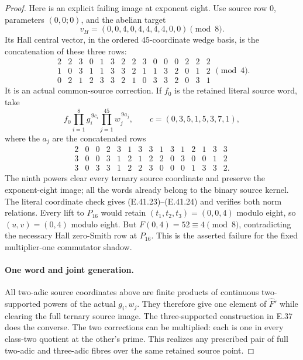 \begin{proof}
Here is an explicit failing image at exponent
eight.  Use source row $0$, parameters $(0,0;0)$,
and the abelian target
\[
             v_H=(0,0,4,0,4,4,4,4,0,0)\pmod8.
 \tag{E.41.23}
\]
Its Hall central vector, in the ordered
$45$-coordinate wedge basis, is the
concatenation of these three rows:
\[
 \begin{array}{rrrrrrrrrrrrrrr}
 2&2&3&0&1&3&2&2&3&0&0&0&2&2&2\\
 1&0&3&1&1&3&3&2&1&1&3&2&0&1&2\\
 0&2&1&2&3&3&2&1&0&3&3&2&0&3&1
 \end{array}
 \pmod4 .
 \tag{E.41.24}
\]
It is an actual common-source correction.
If $f_0$ is the retained literal source word,
take
\[
          f_0\prod_{i=1}^8g_i^{\,9c_i}
                 \prod_{j=1}^{45}w_j^{\,9a_j},
 \qquad c=(0,3,5,1,5,3,7,1),
 \tag{E.41.25}
\]
where the $a_j$ are the concatenated rows
\[
 \begin{array}{rrrrrrrrrrrrrrr}
 2&0&0&2&3&1&3&3&1&3&1&2&1&3&3\\
 3&0&0&3&1&2&1&2&2&0&3&0&0&1&2\\
 3&0&3&3&1&2&2&3&0&0&0&1&3&3&2 .
 \end{array}
 \tag{E.41.26}
\]
The ninth powers clear every ternary source
coordinate and preserve the exponent-eight
image; all the words already belong to the
binary source kernel.
The literal coordinate check gives
\textup{(E.41.23)--(E.41.24)} and verifies
both norm relations.
Every lift to $P_{16}$ would retain
$(t_1,t_2,t_3)=(0,0,4)$ modulo eight,
so $(u,v)=(0,4)$ modulo eight.
But $F(0,4)=52\equiv4\pmod8$, contradicting
the necessary Hall zero-Smith row at $P_{16}$.
This is the asserted failure for the fixed
multiplier-one commutator shadow.

\paragraph{One word and joint generation.}
All two-adic source coordinates above are
finite products of continuous two-supported
powers of the actual $g_i,w_j$.
They therefore give one element of
$\widehat F'$ while clearing the full ternary
source image.  The three-supported
construction in E.37 does the converse.
The two corrections can be multiplied:
each is one in every class-two quotient at
the other's prime.  This realizes any
prescribed pair of full two-adic and
three-adic fibres over the same retained
source point.


\end{proof}
